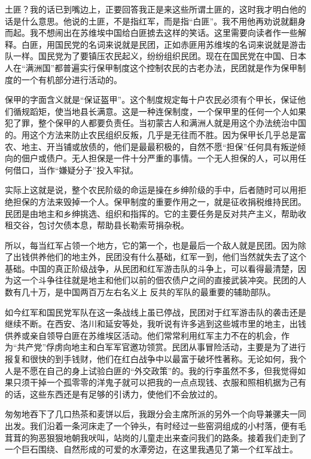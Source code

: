 \documentclass[10pt]{book}
\begin{document}
土匪？我的话已到嘴边上，正要回答我正是来这些所谓土匪的，这时我才明白他的话是什么意思。他说的土匪，不是指红军，而是指“白匪”。我不用他再劝说就翻身而起。我不想闹出在苏维埃中国给白匪掳去这样的笑话。这里需要向读者作一些解释。白匪，用国民党的名词来说就是民团，正如赤匪用苏维埃的名词来说就是游击队一样。国民党为了要镇压农民起义，纷纷组织民团。现在在国民党在中国、日本人在“满洲国”都普遍实行保甲制度这个控制农民的古老办法，民团就是作为保甲制度的一个有机部分进行活动的。

保甲的字面含义就是“保证盔甲”。这个制度规定每十户农民必须有个甲长，保证他们循规蹈矩，使当地县长满意。这是一种连保制度，一个保甲里的任何一个人如果犯了罪，整个保甲的人都要负责任。当初蒙古人和满洲人就是用这个办法统治中国的。用这个方法来防止农民组织反叛，几乎是无往而不胜。因为保甲长几乎总是富农、地主、开当铺或放债的，他们是最最积极的，自然不愿“担保”任何具有叛逆倾向的佃户或债户。无人担保是一件十分严重的事情。一个无人担保的人，可以用任何借口，当作“嫌疑分子”投入牢狱。

实际上这就是说，整个农民阶级的命运是操在乡绅阶级的手中，后者随时可以用拒绝担保的方法来毁掉一个人。保甲制度的重要作用之一，就是征收捐税维持民团。民团是由地主和乡绅挑选、组织和指挥的。它的主要任务是反对共产主义，帮助收租交谷，包讨欠债本息，帮助县长勒索苛捐杂税。

所以，每当红军占领一个地方，它的第一个，也是最后一个敌人就是民团。因为除了出钱供养他们的地主外，民团没有什么基础，红军一到，他们当然就失去了这个基础。中国的真正阶级战争，从民团和红军游击队的斗争上，可以看得最清楚，因为这一个斗争往往就是地主和他们以前的佃农债户之间的直接武装冲突。民团的人数有几十万，是中国两百万左右名义上 反共的军队的最重要的辅助部队。

如今红军和国民党军队在这一条战线上虽已停战，民团对于红军游击队的袭击还是继续不断。在西安、洛川和延安等处，我听说有许多逃到这些城市里的地主，出钱供养或亲自领导白匪在苏维埃区活动。他们常常利用红军主力不在的机会，作为“共产党”俘虏向地主和白军军官邀功领赏。民团从事冒险活动，主要是为了进行报复和很快的到手钱财，他们在红白战争中以最富于破坏性著称。无论如何，我个人是不愿在自己的身上试验白匪的“外交政策”的。我的行李虽然不多，但我觉得如果只须干掉一个孤零零的洋鬼子就可以把我的一点点现钱、衣服和照相机据为己有的话，这些东西还是有足够的引诱力，使他们不会放过的。

匆匆地吞下了几口热茶和麦饼以后，我跟分会主席所派的另外一个向导兼骡夫一同出发。我们沿着一条河床走了一个钟头，有时经过一些窑洞组成的小村落，便有毛茸茸的狗恶狠狠地朝我吠叫，站岗的儿童走出来查问我们的路条。接着我们走到了一个巨石围绕、自然形成的可爱的水潭旁边，在这里我遇见了第一个红军战士。
\end{document}

